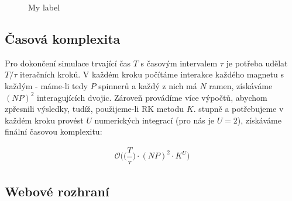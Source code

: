 \documentclass[12pt, a4paper,
 twoside,        %
 openright
]{report}
\begin{document}
\begin{figure}[!ht]
    \caption{My label}
    \label{fig:MyLabel}
\end{figure}

\subsection{Časová komplexita}

Pro dokončení simulace trvající čas $T$ s časovým intervalem $\tau$ je potřeba udělat $T/\tau$ iteračních kroků. V každém kroku počítáme interakce každého magnetu s každým - máme-li tedy $P$ spinnerů a každý z nich má $N$ ramen, získáváme $(NP)^2$ interagujících dvojic. Zároveň provádíme více výpočtů, abychom zpřesnili výsledky, tudíž, použijeme-li RK metodu $K$. stupně a potřebujeme v každém kroku provést $U$ numerických integrací (pro nás je $U = 2$), získáváme finální časovou komplexitu:

\begin{equation}
    \label{eq:sim_complexity}
    \begin{gathered}
        \mathcal{O} \bigg( \bigg( \dfrac{T}{\tau} \bigg) \cdot (N P)^2 \cdot K^U \bigg)
    \end{gathered}
\end{equation}

\subsection{Webové rozhraní}
\end{document}
